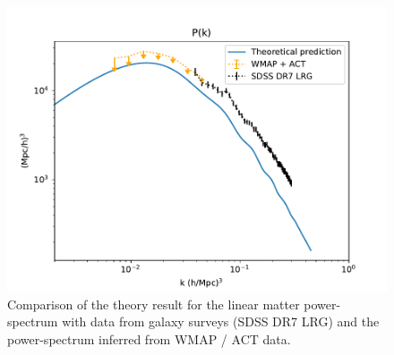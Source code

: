 \documentclass{aa}
\begin{document}
\begin{figure}[h!]
   \includegraphics[scale=0.5]{Figures/milestone_4/Pk.pdf}
   \caption{ Comparison of the theory result for the linear matter power-spectrum with data from galaxy surveys (SDSS DR7 LRG) and the power-spectrum inferred from WMAP / ACT data.}
\label{fig:M4_Pk}
\end{figure}
\end{document}
